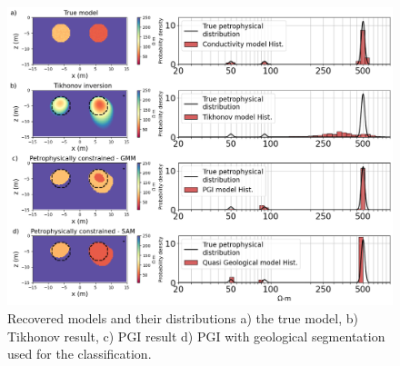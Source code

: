 \begin{figure}[htb]
    \vspace{-0.1cm}
    \begin{center}
    \includegraphics[width=\columnwidth]{figures/pgi_onion_example.png}
    \end{center}
    \vspace{-0.5cm}
\caption{
    Recovered models and their distributions a) the true model, b) Tikhonov result, c) PGI result d) PGI with geological segmentation used for the classification.
}
\label{fig:classificationseg}
\vspace{-0.1cm}
\end{figure}